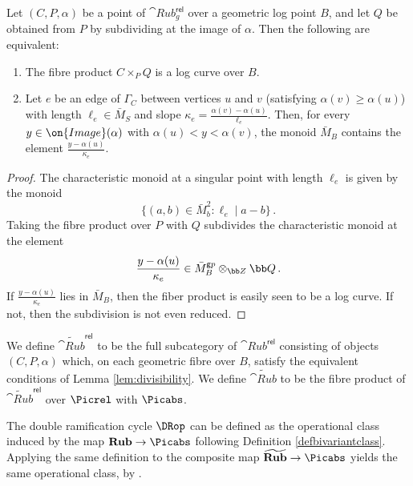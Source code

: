 \begin{lemma}
\notready\label{lem:divisibility}
Let $(C, P, \alpha)$ be a point of $\cat{Rub}_g^{\mathsf{rel}}$ over a geometric log point $B$, and let $Q$ be obtained from $P$ by subdividing at the image of $\alpha$. Then the following are equivalent:
\begin{enumerate}
\item[(i)]
The fibre product $C \times_P Q$ is a log curve over $B$.
\item[(ii)] Let $e$ be an edge of $\Gamma_C$ between vertices $u$ and $v$ (satisfying $\alpha(v) \ge \alpha (u)$) with length $\ell_e\in \bar M_S$ and slope $\kappa_e = \frac{\alpha(v) - \alpha(u)}{\ell_e}$. Then, for every $y \in \on{Image}(\alpha)$ with $\alpha(u) < y < \alpha(v)$, the monoid $\bar M_{B}$ contains the element $\frac{y - \alpha(u)}{\kappa_e}$.
\end{enumerate}
\end{lemma}
\begin{proof}
The characteristic monoid at a singular point with length $\ell_e$ is given by the monoid
\begin{equation}
\{(a,b) \in \bar M_b^2 : \ell_e \mid a-b\}\, .
\end{equation}
Taking the fibre product over $P$ with $Q$ subdivides the characteristic monoid at the element $$\frac{y - \alpha(u)}{\kappa_e} \in \bar M_B^{\mathsf gp} \otimes_{\bb Z} \bb Q\, .$$
If $\frac{y - \alpha(u)}{\kappa_e}$ lies in $\bar M_B$, then the fiber product is easily seen to be a log curve. If not, then the subdivision is not even reduced.
\end{proof}

\newcommand{\newRub}{\widetilde{\cat{Rub}}}
\newcommand{\newRubrel}{\newRub^{\mathsf{rel}}}
\begin{definition}
\notready
We define $\newRubrel$ to be the full subcategory of $\cat{Rub}^{\mathsf{rel}}$ consisting of objects $(C, P, \alpha)$ which, on each geometric fibre over $B$, satisfy the equivalent conditions of Lemma \ref{lem:divisibility}. We define $\newRub$ to be the fibre product of $\newRubrel$ over $\Picrel$ with $\Picabs$.
\end{definition}

\begin{remark}
\notready
The double ramification cycle $\DRop$ can be defined as the operational class induced by the map $\cat{Rub} \to \Picabs$ following Definition \ref{defbivariantclass}. Applying the same definition to the composite map $\widetilde{\cat{Rub}} \to \Picabs$ yields the same operational class, by .
\end{remark}


